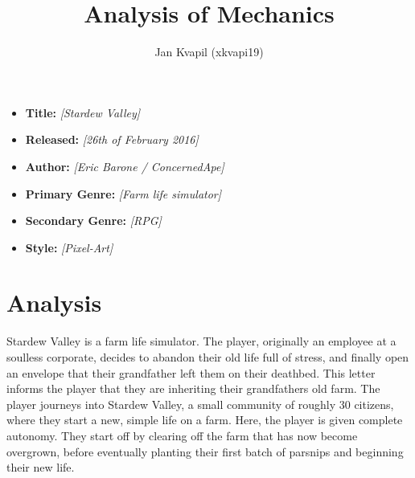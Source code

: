 \documentclass[a4paper,10pt,english]{article}
\title{%
Analysis of Mechanics%
}
\author{%
Jan Kvapil (xkvapi19)%
}
\date{}
\newcommand{\ph}[1]{\textit{[#1]}}
\begin{document}
\maketitle
\thispagestyle{empty}

{%
\large

\begin{itemize}

\item[] \textbf{Title:} \ph{Stardew Valley}

\item[] \textbf{Released:} \ph{26th of February 2016}

\item[] \textbf{Author:} \ph{Eric Barone / ConcernedApe}

\item[] \textbf{Primary Genre:} \ph{Farm life simulator}

\item[] \textbf{Secondary Genre:} \ph{RPG}

\item[] \textbf{Style:} \ph{Pixel-Art}

\end{itemize}

}

\section*{\centering Analysis}




Stardew Valley is a farm life simulator. The player, originally an employee at a soulless corporate, decides to abandon their old life full of stress, and finally open an envelope that their grandfather left them on their deathbed. This letter informs the player that they are inheriting their grandfathers old farm. The player journeys into Stardew Valley, a small community of roughly 30 citizens, where they start a new, simple life on a farm. Here, the player is given complete autonomy. They start off by clearing off the farm that has now become overgrown, before eventually planting their first batch of parsnips and beginning their new life. 
\end{document}
